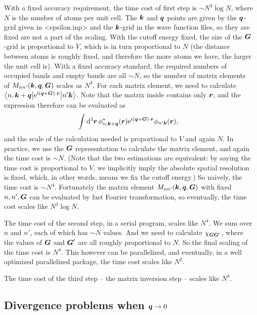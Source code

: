 \documentclass[hyperref, a4paper, 12pt]{report}
\newcommand*{\ii}{\mathrm{i}}
\newcommand*{\ee}{\mathrm{e}}
\def\texttt#1{<#1>}%
\newcommand{\shortcode}[1]{\texttt{#1}}
\begin{document}
With a fixed accuracy requirement,
the time cost of first step is $\sim N^3 \log N$,
where $N$ is the number of atoms per unit cell.
The $\vb*{k}$ and $\vb*{q}$ points are given 
by the $\vb*{q}$-grid given in \shortcode{epsilon.inp}
and the $\vb*{k}$-grid in the wave function files,
so they are fixed are not a part of the scaling.
With the cutoff energy fixed,
the size of the $\vb*{G}$-grid is proportional to $V$,
which is in turn proportional to $N$
(the distance between atoms is roughly fixed,
and therefore the more atoms we have,
the larger the unit cell is).
With a fixed accuracy standard,
the required numbers of occupied bands and empty bands 
are all $\sim N$,
so the number of matrix elements of $M_{nn'}(\vb*{k}, \vb*{q}, \vb*{G})$ scales as $N^3$.
For each matrix element, 
we need to calculate 
$\mel**{n, \vb*{k} + \vb*{q}}{\ee^{\ii (\vb*{q} + \vb*{G}) \cdot \vb*{r} }}{n' \vb*{k}}$.
Note that the matrix inside contains only $\vb*{r}$,
and the expression therefore can be evaluated as 
\[
    \int \dd[3]{\vb*{r}} \phi_{n, \vb*{k} + \vb*{q}}^*(\vb*{r}) 
    \ee^{\ii (\vb*{q} + \vb*{G}) \cdot \vb*{r}}
    \phi_{n' \vb*{k}}(\vb*{r}),
\]
and the scale of the calculation needed is proportional to $V$
and again $N$.
In practice, we use the $\vb*{G}$ representation to calculate the matrix element,
and again the time cost is $\sim N$.
(Note that the two estimations are equivalent: 
by saying the time cost is proportional to $V$,
we implicitly imply the absolute spatial resolution is fixed,
which, in other words, means we fix the cutoff energy.)
So naively, the time cost is $\sim N^4$.
Fortunately the matrix element $M_{nn'}(\vb*{k}, \vb*{q}, \vb*{G})$
with fixed $n, n', \vb*{G}$ 
can be evaluated by fast Fourier transformation,
so eventually, the time cost scales like $N^3 \log N$.

The time cost of the second step, 
in a serial program, scales like $N^4$.
We sum over $n$ and $n'$,
each of which has $\sim N$ values.
And we need to calculate $\chi_{\vb*{G} \vb*{G}'}$,
where the values of $\vb*{G}$ and $\vb*{G}'$ are all roughly proportional to $N$.
So the final scaling of the time cost is $N^4$.
This however can be parallelized,
and eventually, in a well optimized parallelized package,
the time cost scales like $N^2$.

The time cost of the third step -- the matrix inversion step -- 
scales like $N^3$.

\subsection{Divergence problems when $\vb*{q} \to 0$}
\end{document}
